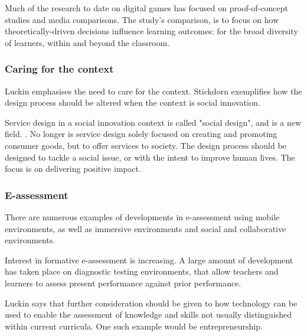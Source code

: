     Much of the research to date on digital games has focused on proof-of-concept studies and media comparisons. The study's comparison, is to focus on how theoretically-driven decisions influence learning outcomes: for the broad diversity of learners, within and beyond the classroom.

    \subsubsection{Caring for the context}
    Luckin \cite{luckin} emphasises the need to care for the context. Stickdorn \cite{stickdorn} exemplifies how the design process should be altered when the context is social innovation.

    Service design in a social innovation context is called "social design", and is a new field. \cite{stickdorn}. No longer is service design solely focused on creating and promoting consumer goods, but to offer services to society. The design process should be designed to tackle a social issue, or with the intent to improve human lives. The focus is on delivering positive impact.

    \subsubsection{E-assessment}
    There are numerous examples of developments in e-assessment using mobile environments, as well as immersive environments and social and collaborative environments.

    Interest in formative e-assessment is increasing. A large amount of development has taken place on diagnostic testing environments, that allow teachers and learners to assess present performance against prior performance. \cite{luckin}

    Luckin says that further consideration should  be given to how technology can be used to enable the assessment of knowledge and skills not usually distinguished within current curricula. \cite{luckin} One such example would be entrepreneurship.

    

